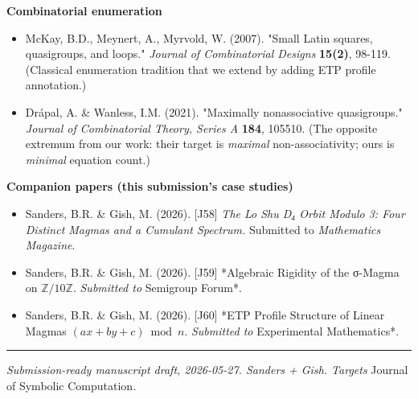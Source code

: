 \documentclass[11pt,reqno]{amsart}
\theoremstyle{plain}
\theoremstyle{definition}
\begin{document}
\textbf{Combinatorial enumeration}
\begin{itemize}
\item McKay, B.D., Meynert, A., Myrvold, W. (2007). "Small Latin squares, quasigroups, and loops." \textit{Journal of Combinatorial Designs} \textbf{15(2)}, 98-119. (Classical enumeration tradition that we extend by adding ETP profile annotation.)
\item Drápal, A. \& Wanless, I.M. (2021). "Maximally nonassociative quasigroups." \textit{Journal of Combinatorial Theory, Series A} \textbf{184}, 105510. (The opposite extremum from our work: their target is \textit{maximal} non-associativity; ours is \textit{minimal} equation count.)
\end{itemize}

\textbf{Companion papers (this submission's case studies)}
\begin{itemize}
\item Sanders, B.R. \& Gish, M. (2026). [J58] \textit{The Lo Shu D₄ Orbit Modulo 3: Four Distinct Magmas and a Cumulant Spectrum.} Submitted to \textit{Mathematics Magazine}.
\item Sanders, B.R. & Gish, M. (2026). [J59] *Algebraic Rigidity of the σ-Magma on $\mathbb{Z}/10\mathbb{Z}$.\textit{ Submitted to }Semigroup Forum*.
\item Sanders, B.R. & Gish, M. (2026). [J60] *ETP Profile Structure of Linear Magmas $(ax+by+c) \bmod n$.\textit{ Submitted to }Experimental Mathematics*.
\end{itemize}

\medskip\hrule\medskip

\textit{Submission-ready manuscript draft, 2026-05-27. Sanders + Gish. Targets }Journal of Symbolic Computation\textit{.}
\end{document}
